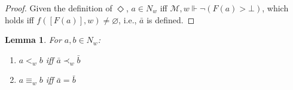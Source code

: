 \documentclass[12pt]{article}
\newtheorem{lemma}{Lemma}
\newcommand{\would}{\mathbin{>}}
\newcommand{\pos}{\mathop{\Diamond}}
\begin{document}
\begin{proof}
Given the definition of $\pos$, $a \in N_w$ iff $\mathcal{M},w \Vdash \neg(F(a) \would \bot)$, which holds iff $f([F(a)],w) \neq \varnothing$, i.e., $\bar{a}$ is defined. 
\end{proof}


\begin{lemma}\label{lem:order}
For $a,b \in N_w$:
    \begin{enumerate}
        \item $a <_w b$ iff $\bar{a} \prec_w \bar{b}$
        \item $a \equiv_w b$ iff $\bar{a} = \bar{b}$
    \end{enumerate}
\end{lemma}
\end{document}
